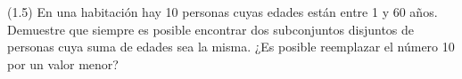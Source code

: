 
(1.5) En una habitación hay 10 personas cuyas edades están entre 1 y 60 años. Demuestre que siempre es posible encontrar dos subconjuntos disjuntos de personas cuya suma de edades sea la misma. ¿Es posible reemplazar el número 10 por un valor menor?

